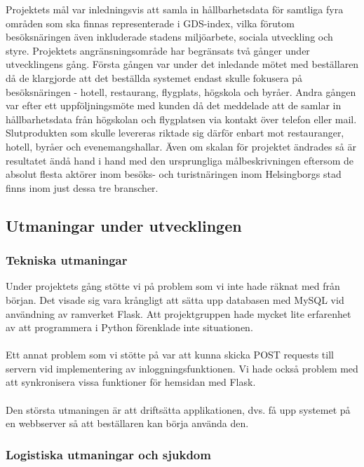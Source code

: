 \documentclass[12pt]{article}
\begin{document}
Projektets mål var inledningsvis att samla in hållbarhetsdata för samtliga fyra områden som ska finnas representerade i GDS-index, vilka förutom besöksnäringen även inkluderade stadens miljöarbete, sociala utveckling och styre. Projektets angränsningsområde har begränsats två gånger under utvecklingens gång. Första gången var under det inledande mötet med beställaren då de klargjorde att det beställda systemet endast skulle fokusera på besöksnäringen - hotell, restaurang, flygplats, högskola och byråer. Andra gången var efter ett uppföljningsmöte med kunden då det meddelade att de samlar in hållbarhetsdata från högskolan och flygplatsen via kontakt över telefon eller mail. Slutprodukten som skulle levereras riktade sig därför enbart mot restauranger, hotell, byråer och evenemangshallar. Även om skalan för projektet ändrades så är resultatet ändå hand i hand med den ursprungliga målbeskrivningen eftersom de absolut flesta aktörer inom besöks- och turistnäringen inom Helsingborgs stad finns inom just dessa tre branscher.


\subsection{Utmaningar under utvecklingen}

\subsubsection{Tekniska utmaningar}
Under projektets gång stötte vi på problem som vi inte hade räknat med från början. Det visade sig vara krångligt att sätta upp databasen med MySQL vid användning av ramverket Flask. Att projektgruppen hade mycket lite erfarenhet av att programmera i Python förenklade inte situationen.\\\\
Ett annat problem som vi stötte på var att kunna skicka POST requests till servern vid implementering av inloggningsfunktionen. Vi hade också problem med att synkronisera vissa funktioner för hemsidan med Flask.\\\\
Den största utmaningen är att driftsätta applikationen, dvs. få upp systemet på en webbserver så att beställaren kan börja använda den.

\subsubsection{Logistiska utmaningar och sjukdom}
\end{document}
